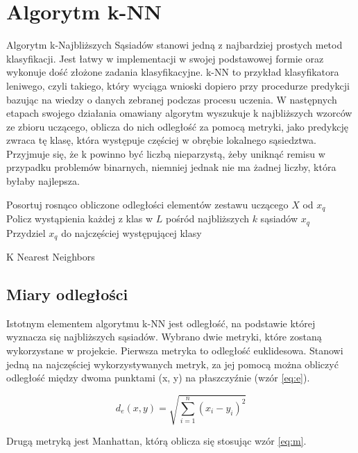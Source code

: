 \section{Algorytm k-NN}
Algorytm k-Najbliższych Sąsiadów stanowi jedną z najbardziej prostych metod klasyfikacji. Jest łatwy w implementacji w swojej podstawowej formie oraz wykonuje dość złożone zadania klasyfikacyjne. k-NN to przykład klasyfikatora leniwego, czyli takiego, który wyciąga wnioski dopiero przy procedurze predykcji bazując na wiedzy o danych zebranej podczas procesu uczenia. W następnych etapach swojego działania omawiany algorytm wyszukuje k najbliższych wzorców ze zbioru uczącego, oblicza do nich odległość za pomocą metryki, jako predykcję zwraca tę klasę, która występuje częściej w obrębie lokalnego sąsiedztwa. Przyjmuje się, że k powinno być liczbą nieparzystą, żeby uniknąć remisu w przypadku problemów binarnych, niemniej jednak nie ma żadnej liczby, która byłaby najlepsza.

\begin{algorithm}[!ht]
    \label{algorytm}
    \BlankLine
    \SetAlgoVlined

    Posortuj rosnąco obliczone odległości elementów zestawu uczącego $X$ od $x_{q}$ \\
    Policz wystąpienia każdej z klas w $L$ pośród najbliższych $k$ sąsiadów $x_{q}$ \\
    Przydziel $x_{q}$ do najczęściej występującej klasy
    \caption{K Nearest Neighbors}
\end{algorithm}

\subsection{Miary odległości}
Istotnym elementem algorytmu k-NN jest odległość, na podstawie której wyznacza się najbliższych sąsiadów. Wybrano dwie  metryki, które zostaną wykorzystane w projekcie.
Pierwsza metryka to odległość euklidesowa. Stanowi jedną na najczęściej wykorzystywanych metryk, za jej pomocą można obliczyć odległość między dwoma punktami (x, y) na płaszczyźnie (wzór \ref{eq:e}).

\begin{center}
    \begin{equation}
        \label{eq:e}
        d_{e}\left( x,y\right)   = \sqrt {\sum _{i=1}^{n}  \left( x_{i}-y_{i}\right)^2 }
    \end{equation}
\end{center}
\noindent
Drugą metryką jest Manhattan, którą oblicza się stosując wzór \ref{eq:m}.

